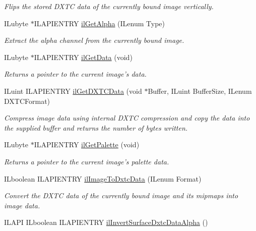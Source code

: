 \begin{DoxyCompactItemize}
\begin{DoxyCompactList}\small\item\em Flips the stored D\+X\+T\+C data of the currently bound image vertically. \end{DoxyCompactList}\item 
I\+Lubyte $\ast$I\+L\+A\+P\+I\+E\+N\+T\+R\+Y \hyperlink{group__data_gaaf70fd0dbf35dd1e31700543c6e763d4}{il\+Get\+Alpha} (I\+Lenum Type)
\begin{DoxyCompactList}\small\item\em Extract the alpha channel from the currently bound image. \end{DoxyCompactList}\item 
I\+Lubyte $\ast$I\+L\+A\+P\+I\+E\+N\+T\+R\+Y \hyperlink{group__data_ga7935a3b79dcdc71ee0f682854939dcc9}{il\+Get\+Data} (void)
\begin{DoxyCompactList}\small\item\em Returns a pointer to the current image's data. \end{DoxyCompactList}\item 
I\+Luint I\+L\+A\+P\+I\+E\+N\+T\+R\+Y \hyperlink{group__data_ga4ae3b92dd5e43a62dd44b3ee9d85087f}{il\+Get\+D\+X\+T\+C\+Data} (void $\ast$Buffer, I\+Luint Buffer\+Size, I\+Lenum D\+X\+T\+C\+Format)
\begin{DoxyCompactList}\small\item\em Compress image data using internal D\+X\+T\+C compression and copy the data into the supplied buffer and returns the number of bytes written. \end{DoxyCompactList}\item 
I\+Lubyte $\ast$I\+L\+A\+P\+I\+E\+N\+T\+R\+Y \hyperlink{group__data_gaffc60ac194afa1ed9d1bdc266adc5d29}{il\+Get\+Palette} (void)
\begin{DoxyCompactList}\small\item\em Returns a pointer to the current image's palette data. \end{DoxyCompactList}\item 
\hypertarget{group__data_gaa7c7b55455ab5af387502a4cf4ede91f}{I\+Lboolean I\+L\+A\+P\+I\+E\+N\+T\+R\+Y \hyperlink{group__data_gaa7c7b55455ab5af387502a4cf4ede91f}{il\+Image\+To\+Dxtc\+Data} (I\+Lenum Format)}\label{group__data_gaa7c7b55455ab5af387502a4cf4ede91f}

\begin{DoxyCompactList}\small\item\em Convert the D\+X\+T\+C data of the currently bound image and its mipmaps into image data. \end{DoxyCompactList}\item 
\hypertarget{group__data_ga895ded17dd75715105a64dddb78f9790}{I\+L\+A\+P\+I I\+Lboolean I\+L\+A\+P\+I\+E\+N\+T\+R\+Y \hyperlink{group__data_ga895ded17dd75715105a64dddb78f9790}{il\+Invert\+Surface\+Dxtc\+Data\+Alpha} ()}\label{group__data_ga895ded17dd75715105a64dddb78f9790}


\end{DoxyCompactItemize}
